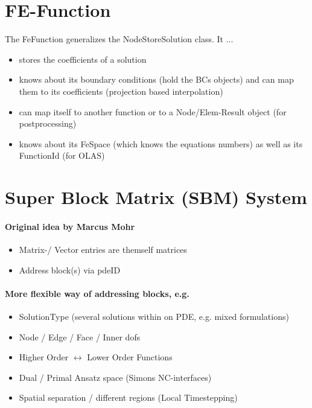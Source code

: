\section{FE-Function}

The FeFunction generalizes the NodeStoreSolution class. It ...
\begin{itemize}
 \item stores the coefficients of a solution
\item knows about its boundary conditions (hold the BCs objects) and can map them to its coefficients (projection based interpolation)
\item can map itself to another function or to a Node/Elem-Result object (for postprocessing)
\item knows about its FeSpace (which knows the equations numbers) as well as its FunctionId (for OLAS)
\end{itemize}

\section{Super Block Matrix (SBM) System}

\paragraph{Original idea by Marcus Mohr}
\begin{itemize}
 \item Matrix-/ Vector entries are themself matrices
\item Address block(s) via pdeID
\end{itemize} 

\paragraph{More flexible way of addressing blocks, e.g.}
\begin{itemize}
  \item SolutionType (several solutions within on PDE, e.g. mixed formulations)
\item Node / Edge / Face / Inner dofs
\item Higher Order $\leftrightarrow$ Lower Order Functions
\item Dual / Primal Ansatz space (Simons NC-interfaces)
\item Spatial separation / different regions (Local Timestepping)
\end{itemize}

